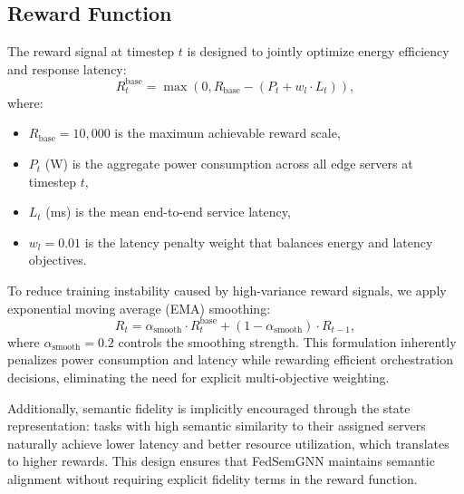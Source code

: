 \subsection{Reward Function}
The reward signal at timestep $t$ is designed to jointly optimize energy efficiency and response latency:
\begin{equation}
	R_t^{\text{base}} = \max\!\left(0, R_{\text{base}} - \left(P_t + w_l \cdot L_t\right)\right),
	\label{eq:base_reward}
\end{equation}
where:
\begin{itemize}
	\item $R_{\text{base}} = 10{,}000$ is the maximum achievable reward scale,
	\item $P_t$ (W) is the aggregate power consumption across all edge servers at timestep $t$,
	\item $L_t$ (ms) is the mean end-to-end service latency,
	\item $w_l = 0.01$ is the latency penalty weight that balances energy and latency objectives.
\end{itemize}

To reduce training instability caused by high-variance reward signals, we apply exponential moving average (EMA) smoothing:
\begin{equation}
	R_t = \alpha_{\text{smooth}} \cdot R_t^{\text{base}} + (1 - \alpha_{\text{smooth}}) \cdot R_{t-1},
	\label{eq:smoothed_reward}
\end{equation}
where $\alpha_{\text{smooth}} = 0.2$ controls the smoothing strength. This formulation inherently penalizes power consumption and latency while rewarding efficient orchestration decisions, eliminating the need for explicit multi-objective weighting.

Additionally, semantic fidelity is implicitly encouraged through the state representation: tasks with high semantic similarity to their assigned servers naturally achieve lower latency and better resource utilization, which translates to higher rewards. This design ensures that FedSemGNN maintains semantic alignment without requiring explicit fidelity terms in the reward function.


